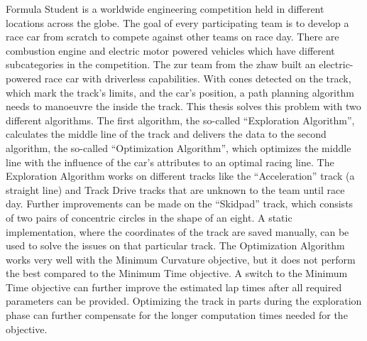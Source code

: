 Formula Student is a worldwide engineering competition held in different locations across the globe. The goal of every participating team is to develop a race car from scratch to compete against other teams on race day. There are combustion engine and electric motor powered vehicles which have different subcategories in the competition. The \acrlong{zur} team from the \acrlong{zhaw} built an electric-powered race car with driverless capabilities. With cones detected on the track, which mark the track's limits, and the car's position, a path planning algorithm needs to manoeuvre the inside the track. This thesis solves this problem with two different algorithms. The first algorithm, the so-called ``Exploration Algorithm'', calculates the middle line of the track and delivers the data to the second algorithm, the so-called ``Optimization Algorithm'', which optimizes the middle line with the influence of the car's attributes to an optimal racing line. The Exploration Algorithm works on different tracks like the ``Acceleration'' track (a straight line) and Track Drive tracks that are unknown to the team until race day. Further improvements can be made on the ``Skidpad'' track, which consists of two pairs of concentric circles in the shape of an eight. A static implementation, where the coordinates of the track are saved manually, can be used to solve the issues on that particular track. The Optimization Algorithm works very well with the Minimum Curvature objective, but it does not perform the best compared to the Minimum Time objective. A switch to the Minimum Time objective can further improve the estimated lap times after all required parameters can be provided. Optimizing the track in parts during the exploration phase can further compensate for the longer computation times needed for the objective.
